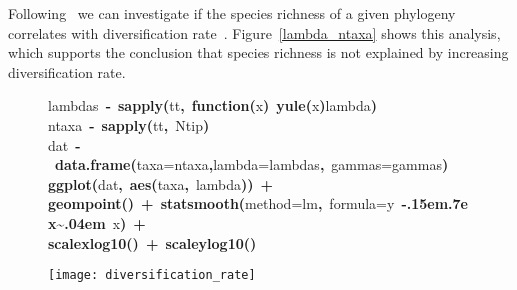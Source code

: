 \documentclass[authoryear, preprint]{elsarticle}
\makeatletter
\newcommand{\hlfunctioncall}[1]{\textcolor[rgb]{.5,0,.33}{\textbf{#1}}}%
\newcommand{\hlkeyword}[1]{\textbf{#1}}%
\newcommand{\hlargument}[1]{\textcolor[rgb]{.69,.25,.02}{#1}}%
\newcommand{\hlformalargs}[1]{\hlargument{#1}}%
\newcommand{\hlassignement}[1]{\textbf{#1}}%
\newcommand{\hlsymbol}[1]{#1}%
\def\urltilda{\kern -.15em\lower .7ex\hbox{\~{}}\kern .04em}%
\newcommand{\hlstd}[1]{\textcolor[rgb]{0,0,0}{#1}}%
\newenvironment{kframe}{%
 \def\FrameCommand##1{\hskip\@totalleftmargin \hskip-\fboxsep
 \colorbox{shadecolor}{##1}\hskip-\fboxsep
     \hskip-\linewidth \hskip-\@totalleftmargin \hskip\columnwidth}%
 \MakeFramed {\advance\hsize-\width
   \@totalleftmargin\z@ \linewidth\hsize
   \@setminipage}}%
 {\par\unskip\endMakeFramed}
\newenvironment{knitrout}{}{} %
\makeatother
\begin{document}
Following~\citet{McPeek2007} we can investigate if the species richness of a given phylogeny correlates with diversification rate~\citep{Nee1994a}.  Figure~\ref{lambda_ntaxa} shows this analysis, which supports the conclusion that species richness is not explained by increasing diversification rate.   
\begin{figure}
  \begin{center}
\begin{knitrout}
\color{fgcolor}\begin{kframe}
\begin{flushleft}
\ttfamily\noindent
\hlsymbol{lambdas}{\ }\hlassignement{\usebox{\hlnormalsizeboxlessthan}-}{\ }\hlfunctioncall{sapply}\hlkeyword{(}\hlsymbol{tt}\hlkeyword{,}{\ }\hlkeyword{function}\hlkeyword{(}\hlformalargs{x}\hlkeyword{)}{\ }\hlfunctioncall{yule}\hlkeyword{(}\hlsymbol{x}\hlkeyword{)}\hlkeyword{\usebox{\hlnormalsizeboxdollar}}\hlsymbol{lambda}\hlkeyword{)}\hspace*{\fill}\\
\hlstd{}\hlsymbol{ntaxa}{\ }\hlassignement{\usebox{\hlnormalsizeboxlessthan}-}{\ }\hlfunctioncall{sapply}\hlkeyword{(}\hlsymbol{tt}\hlkeyword{,}{\ }\hlsymbol{Ntip}\hlkeyword{)}\hspace*{\fill}\\
\hlstd{}\hlsymbol{dat}{\ }\hlassignement{\usebox{\hlnormalsizeboxlessthan}-}{\ }\hlfunctioncall{data.frame}\hlkeyword{(}\hlargument{taxa}\hlargument{=}\hlsymbol{ntaxa}\hlkeyword{,}\hlargument{lambda}\hlargument{=}\hlsymbol{lambdas}\hlkeyword{,}{\ }\hlargument{gammas}\hlargument{=}\hlsymbol{gammas}\hlkeyword{)}\hspace*{\fill}\\
\hlstd{}\hlfunctioncall{ggplot}\hlkeyword{(}\hlsymbol{dat}\hlkeyword{,}{\ }\hlfunctioncall{aes}\hlkeyword{(}\hlsymbol{taxa}\hlkeyword{,}{\ }\hlsymbol{lambda}\hlkeyword{)}\hlkeyword{)}{\ }\hlkeyword{+}\hspace*{\fill}\\
\hlstd{}\hlfunctioncall{geom\usebox{\hlnormalsizeboxunderscore}point}\hlkeyword{(}\hlkeyword{)}{\ }\hlkeyword{+}{\ }\hlfunctioncall{stat\usebox{\hlnormalsizeboxunderscore}smooth}\hlkeyword{(}\hlargument{method}\hlargument{=}\hlsymbol{lm}\hlkeyword{,}{\ }\hlargument{formula}\hlargument{=}\hlsymbol{y}{\ }\hlkeyword{\urltilda{}}{\ }\hlsymbol{x}\hlkeyword{)}{\ }\hlkeyword{+}\hspace*{\fill}\\
\hlstd{}\hlfunctioncall{scale\usebox{\hlnormalsizeboxunderscore}x\usebox{\hlnormalsizeboxunderscore}log10}\hlkeyword{(}\hlkeyword{)}{\ }\hlkeyword{+}{\ }\hlfunctioncall{scale\usebox{\hlnormalsizeboxunderscore}y\usebox{\hlnormalsizeboxunderscore}log10}\hlkeyword{(}\hlkeyword{)}\mbox{}
\normalfont
\end{flushleft}
\texttt{[image: diversification\_rate]} \end{kframe}
\end{knitrout}


\end{center}
\end{figure}
\end{document}
